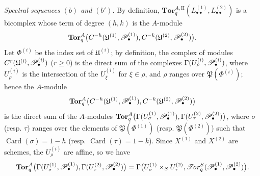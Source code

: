 \begin{env}[6.6.4]
\label{III.6.6.4}
\emph{Spectral sequences $(b)$ and $(b')$.}
By definition, $\mathbf{Tor}_q^{A,\mathrm{II}}
(L_{\bullet\bullet}^{(1)},L_{\bullet\bullet}^{(2)})$
is a bicomplex whose term of degree $(h,k)$ is the $A$-module
\[
  \mathbf{Tor}_q^A
  \bigl(
    C^{-h}(\mathfrak U^{(1)},\mathscr{P}_\bullet^{(1)}),
    C^{-k}(\mathfrak U^{(2)},\mathscr{P}_\bullet^{(2)})
  \bigr).
\]
Let $\Phi^{(i)}$ be the index set of $\mathfrak U^{(i)}$; by
definition, the complex of modules
$C^r(\mathfrak U^{(i)},\mathscr{P}_\bullet^{(i)})$ ($r\geqslant0$) is the direct sum
of the complexes $\Gamma(U_\rho^{(i)},\mathscr{P}_\bullet^{(i)})$,
where $U_\rho^{(i)}$ is the intersection of the
$U_\xi^{(i)}$ for $\xi\in\rho$, and $\rho$ ranges over
$\mathfrak P(\Phi^{(i)})$; hence the $A$-module
\[
  \mathbf{Tor}_q^A
  \bigl(
    C^{-h}(\mathfrak U^{(1)},\mathscr{P}_\bullet^{(1)}),
    C^{-k}(\mathfrak U^{(2)},\mathscr{P}_\bullet^{(2)})
  \bigr)
\]
is the direct sum of the $A$-modules $\mathbf{Tor}_q^A
\bigl(
\Gamma(U_\sigma^{(1)},\mathscr{P}_\bullet^{(1)}),
\Gamma(U_\tau^{(2)},\mathscr{P}_\bullet^{(2)})
\bigr)$,
where $\sigma$ (resp. $\tau$) ranges over the elements of
$\mathfrak P(\Phi^{(1)})$ (resp. $\mathfrak P(\Phi^{(2)})$) such that
$\operatorname{Card}(\sigma)=1-h$ (resp.
$\operatorname{Card}(\tau)=1-k$).  Since $X^{(1)}$ and $X^{(2)}$ are schemes, the
$U_\rho^{(i)}$ are affine, so we have 
\[
  \mathbf{Tor}_q^A
  \bigl(
    \Gamma(U_\sigma^{(1)},\mathscr{P}_\bullet^{(1)}),
    \Gamma(U_\tau^{(2)},\mathscr{P}_\bullet^{(2)})
  \bigr)
  =
  \Gamma\bigl(
    U_\sigma^{(1)}\times_SU_\tau^{(2)},
    \mathscr{T}\!\mathit{or}_q^S(\mathscr{P}_\bullet^{(1)},\mathscr{P}_\bullet^{(2)})
  \bigr).
\]



\end{env}
